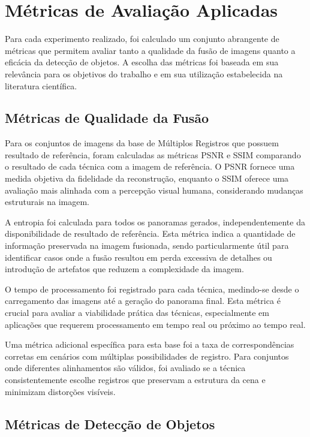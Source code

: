 \section{Métricas de Avaliação Aplicadas}

Para cada experimento realizado, foi calculado um conjunto abrangente de métricas que permitem avaliar tanto a qualidade da fusão de imagens quanto a eficácia da detecção de objetos. A escolha das métricas foi baseada em sua relevância para os objetivos do trabalho e em sua utilização estabelecida na literatura científica.

\subsection{Métricas de Qualidade da Fusão}

Para os conjuntos de imagens da base de Múltiplos Registros que possuem resultado de referência, foram calculadas as métricas PSNR e SSIM comparando o resultado de cada técnica com a imagem de referência. O PSNR fornece uma medida objetiva da fidelidade da reconstrução, enquanto o SSIM oferece uma avaliação mais alinhada com a percepção visual humana, considerando mudanças estruturais na imagem.

A entropia foi calculada para todos os panoramas gerados, independentemente da disponibilidade de resultado de referência. Esta métrica indica a quantidade de informação preservada na imagem fusionada, sendo particularmente útil para identificar casos onde a fusão resultou em perda excessiva de detalhes ou introdução de artefatos que reduzem a complexidade da imagem.

O tempo de processamento foi registrado para cada técnica, medindo-se desde o carregamento das imagens até a geração do panorama final. Esta métrica é crucial para avaliar a viabilidade prática das técnicas, especialmente em aplicações que requerem processamento em tempo real ou próximo ao tempo real.

Uma métrica adicional específica para esta base foi a taxa de correspondências corretas em cenários com múltiplas possibilidades de registro. Para conjuntos onde diferentes alinhamentos são válidos, foi avaliado se a técnica consistentemente escolhe registros que preservam a estrutura da cena e minimizam distorções visíveis.

\subsection{Métricas de Detecção de Objetos}

